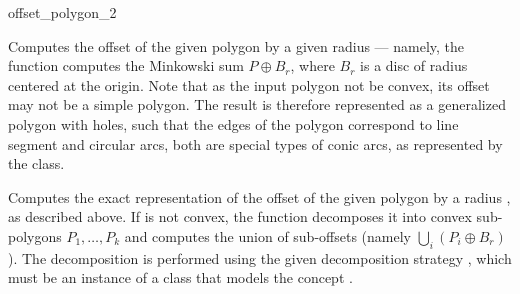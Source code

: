
\ccRefPageBegin

\begin{ccRefFunction}{offset_polygon_2}


   {Computes the offset of the given polygon  by a given radius
     --- namely, the function computes the Minkowski sum
    $P \oplus B_r$, where $B_r$ is a disc of radius  centered at the
    origin.
    Note that as the input polygon not be convex, its offset may not be a
    simple polygon. The result is therefore represented as a generalized
    polygon with holes, such that the edges of the polygon correspond to
    line segment and circular arcs, both are special types of conic arcs,
    as represented by the  class.
    }

   {Computes the exact representation of the offset of the given polygon
     by a radius , as described above.
    If  is not convex, the function decomposes it into convex
    sub-polygons $P_1, \ldots, P_k$ and computes the union of sub-offsets
    (namely $\bigcup_{i}{(P_i \oplus B_r)}$).
    The decomposition is performed using the given decomposition strategy
    , which must be an instance of a class that models the
    concept .
    }

\end{ccRefFunction}

\ccRefPageEnd
